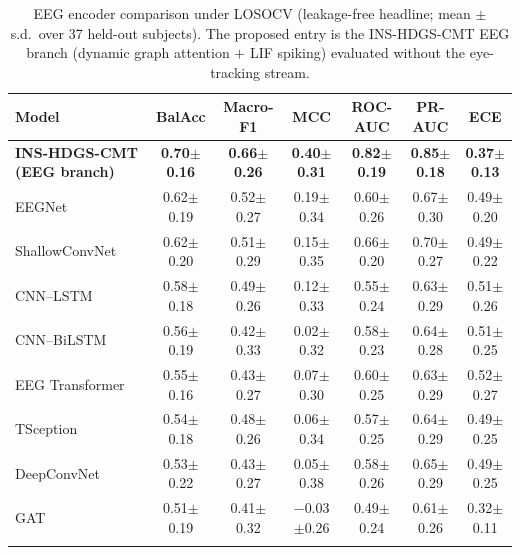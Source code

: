 \begin{table}[t]
  \caption{EEG encoder comparison under LOSOCV (leakage-free headline; mean $\pm$ s.d.\ over 37 held-out subjects). The proposed entry is the INS-HDGS-CMT EEG branch (dynamic graph attention $+$ LIF spiking) evaluated without the eye-tracking stream.}
  \label{tab:eeg_baselines}
  \centering
  \small
  \begin{tabular}{@{}lcccccc@{}}
    \toprule
    Model & BalAcc & Macro-F1 & MCC & ROC-AUC & PR-AUC & ECE \\
    \midrule
    \textbf{INS-HDGS-CMT (EEG branch)} & \textbf{0.70$\pm$0.16} & \textbf{0.66$\pm$0.26} & \textbf{0.40$\pm$0.31} & \textbf{0.82$\pm$0.19} & \textbf{0.85$\pm$0.18} & \textbf{0.37$\pm$0.13} \\
    EEGNet          & 0.62$\pm$0.19 & 0.52$\pm$0.27 & 0.19$\pm$0.34 & 0.60$\pm$0.26 & 0.67$\pm$0.30 & 0.49$\pm$0.20 \\
    ShallowConvNet  & 0.62$\pm$0.20 & 0.51$\pm$0.29 & 0.15$\pm$0.35 & 0.66$\pm$0.20 & 0.70$\pm$0.27 & 0.49$\pm$0.22 \\
    CNN--LSTM       & 0.58$\pm$0.18 & 0.49$\pm$0.26 & 0.12$\pm$0.33 & 0.55$\pm$0.24 & 0.63$\pm$0.29 & 0.51$\pm$0.26 \\
    CNN--BiLSTM     & 0.56$\pm$0.19 & 0.42$\pm$0.33 & 0.02$\pm$0.32 & 0.58$\pm$0.23 & 0.64$\pm$0.28 & 0.51$\pm$0.25 \\
    EEG Transformer & 0.55$\pm$0.16 & 0.43$\pm$0.27 & 0.07$\pm$0.30 & 0.60$\pm$0.25 & 0.63$\pm$0.29 & 0.52$\pm$0.27 \\
    TSception       & 0.54$\pm$0.18 & 0.48$\pm$0.26 & 0.06$\pm$0.34 & 0.57$\pm$0.25 & 0.64$\pm$0.29 & 0.49$\pm$0.25 \\
    DeepConvNet     & 0.53$\pm$0.22 & 0.43$\pm$0.27 & 0.05$\pm$0.38 & 0.58$\pm$0.26 & 0.65$\pm$0.29 & 0.49$\pm$0.25 \\
    GAT             & 0.51$\pm$0.19 & 0.41$\pm$0.32 & $-$0.03$\pm$0.26 & 0.49$\pm$0.24 & 0.61$\pm$0.26 & 0.32$\pm$0.11 \\
    \botrule
  \end{tabular}
\end{table}
